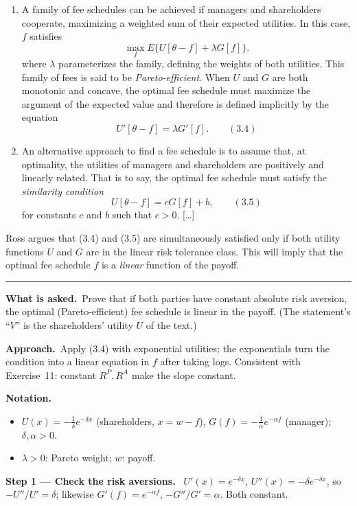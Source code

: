 \documentclass[11pt,a4paper]{article}
\newcommand{\notation}{\par\noindent\textbf{Notation.}}
\newcommand{\step}[2]{\par\medskip\noindent\textbf{Step #1 --- #2.}~}
\newcommand{\asked}{\par\medskip\noindent\textbf{What is asked.}~}
\newcommand{\approach}{\par\smallskip\noindent\textbf{Approach.}~}
\newcommand{\stmtend}{\par\endgroup\nopagebreak\noindent\rule{\linewidth}{0.4pt}\par\medskip}
\begin{document}
\begin{enumerate}
\def\labelenumi{\arabic{enumi}.}
\item
  A family of fee schedules can be achieved if managers and shareholders cooperate, maximizing a
  weighted sum of their expected utilities. In this case, \(f\) satisfies
  \[\max_f E\{U[\theta - f] + \lambda G[f]\}.\] where \(\lambda\) parameterizes the family, defining
  the weights of both utilities. This family of fees is said to be \emph{Pareto-efficient}. When
  \(U\) and \(G\) are both monotonic and concave, the optimal fee schedule must maximize the
  argument of the expected value and therefore is defined implicitly by the equation
  \[U'[\theta - f] = \lambda G'[f]. \qquad (3.4)\]
\item
  An alternative approach to find a fee schedule is to assume that, at optimality, the utilities of
  managers and shareholders are positively and linearly related. That is to say, the optimal fee
  schedule must satisfy the \emph{similarity condition} \[U[\theta - f] = cG[f] + b, \qquad (3.5)\]
  for constants \(c\) and \(b\) such that \(c > 0\). {[}\ldots{]}
\end{enumerate}

Ross argues that (3.4) and (3.5) are simultaneously satisfied only if both utility functions \(U\)
and \(G\) are in the linear risk tolerance class. This will imply that the optimal fee schedule
\(f\) is a \emph{linear} function of the payoff.
\stmtend

\asked Prove that if both parties have constant absolute risk aversion, the optimal (Pareto-efficient) fee schedule is linear in the payoff. (The statement's ``$V$'' is the shareholders' utility $U$ of the text.)

\approach Apply (3.4) with exponential utilities; the exponentials turn the condition into a linear equation in $f$ after taking logs. Consistent with Exercise~11: constant $R^P,R^A$ make the slope constant.

\notation
\begin{itemize}
  \item $U(x)=-\frac{1}{\delta}e^{-\delta x}$ (shareholders, $x=w-f$), $G(f)=-\frac{1}{\alpha}e^{-\alpha f}$ (manager); $\delta,\alpha>0$.
  \item $\lambda>0$: Pareto weight; $w$: payoff.
\end{itemize}

\step{1}{Check the risk aversions} $U'(x)=e^{-\delta x}$, $U''(x)=-\delta e^{-\delta x}$, so $-U''/U'=\delta$; likewise $G'(f)=e^{-\alpha f}$, $-G''/G'=\alpha$. Both constant.
\end{document}

